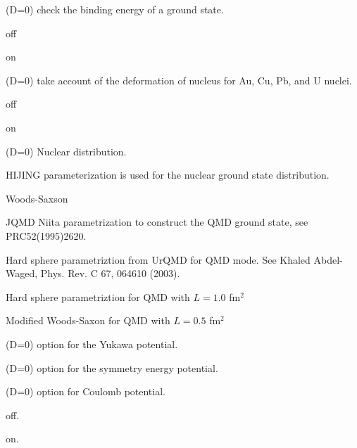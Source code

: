 \documentclass[]{article}
\newenvironment{entry}%
{\begin{list}{}{\setlength{\topsep}{0mm} \setlength{\itemsep}{0mm}
\setlength{\parskip}{0mm} \setlength{\parsep}{0mm}
\setlength{\leftmargin}{20mm} \setlength{\rightmargin}{0mm}
\setlength{\labelwidth}{18mm} \setlength{\labelsep}{2mm}}}%
{\end{list}}
\newenvironment{subentry}%
{\begin{list}{}{\setlength{\topsep}{0mm} \setlength{\itemsep}{0mm}
\setlength{\parskip}{0mm} \setlength{\parsep}{0mm}
\setlength{\leftmargin}{10mm} \setlength{\rightmargin}{0mm}
\setlength{\labelwidth}{18mm} \setlength{\labelsep}{2mm}}}%
{\end{list}}
\newcommand{\itemt}[1]{\item[{\tt #1}\hfill]}
\begin{document}
\begin{entry}
\itemt{mstc(96) :}(D=0) check the binding energy of a ground state.
 \begin{subentry}
            \itemt{$=0$ :} off
            \itemt{$=1$ :} on
 \end{subentry}

\itemt{mstc(97) :}(D=0) take account of the deformation of nucleus
  for Au, Cu, Pb, and U nuclei.
 \begin{subentry}
            \itemt{$=0$ :} off
            \itemt{$=1$ :} on
 \end{subentry}

\itemt{mstc(98) :}(D=0)  Nuclear distribution.
 \begin{subentry}
 \itemt{$=0$ :} HIJING parameterization is used for the
nuclear ground state distribution.
 \itemt{$=1$ :} Woods-Saxson
 \itemt{$=2$ :} JQMD Niita parametrization to construct the QMD ground state,
 see PRC52(1995)2620.
 \itemt{$=3$ :} Hard sphere parametriztion from UrQMD for QMD mode. 
  See Khaled Abdel-Waged, Phys. Rev.  C 67, 064610 (2003).
 \itemt{$=4$ :} Hard sphere parametriztion for QMD with $L=1.0$ fm$^2$
 \itemt{$=5$ :} Modified Woods-Saxon for QMD with $L=0.5$ fm$^2$
 \end{subentry}


\itemt{mstc(99) :}(D=0) option for the Yukawa potential.

\itemt{mstc(100) :}(D=0) option for the symmetry energy potential.

\itemt{mstc(101) :}(D=0) option for Coulomb potential.
 \begin{subentry}
            \itemt{$=0$ :} off.
            \itemt{$=1$ :} on.
 \end{subentry}

%
%
\medskip


\end{entry}
\end{document}
